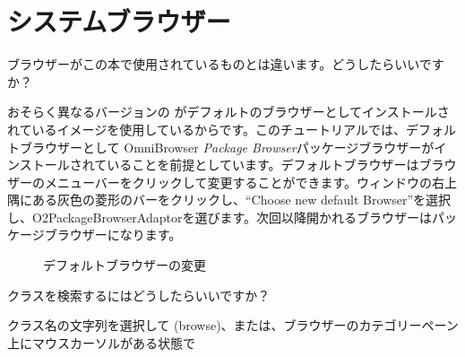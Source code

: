 \documentclass[a4paper,10pt,twoside]{book}
\begin{document}
\section{システムブラウザー}


\begin{faq}
ブラウザーがこの本で使用されているものとは違います。どうしたらいいですか？
\end{faq}
\answer
おそらく異なるバージョンの  がデフォルトのブラウザーとしてインストールされているイメージを使用しているからです。このチュートリアルでは、デフォルトブラウザーとして OmniBrowser \emph{Package Browser}パッケージブラウザーがインストールされていることを前提としています。デフォルトブラウザーはブラウザーのメニューバーをクリックして変更することができます。ウィンドウの右上隅にある灰色の菱形のバーをクリックし、“Choose new default Browser”を選択し、O2PackageBrowserAdaptorを選びます。次回以降開かれるブラウザーはパッケージブラウザーになります。

\begin{figure}[tbh]
	\centering
	\hfill
	\hfill
	\caption{デフォルトブラウザーの変更}
\end{figure}

\begin{faq}
クラスを検索するにはどうしたらいいですか？
\end{faq}
\answer
クラス名の文字列を選択して  (browse)、または、ブラウザーのカテゴリーペーン上にマウスカーソルがある状態で 
\end{document}
